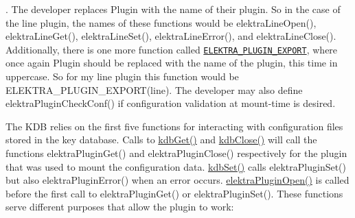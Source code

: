 . The developer replaces {\ttfamily Plugin} with the name of their plugin. So in the case of the line plugin, the names of these functions would be {\ttfamily elektra\+Line\+Open()}, {\ttfamily elektra\+Line\+Get()}, {\ttfamily elektra\+Line\+Set()}, {\ttfamily elektra\+Line\+Error()}, and {\ttfamily elektra\+Line\+Close()}. Additionally, there is one more function called \href{https://doc.libelektra.org/api/current/html/group__plugin.html#ga8dd092048e972a3f0c9c9f54eb41576e}{\tt E\+L\+E\+K\+T\+R\+A\+\_\+\+P\+L\+U\+G\+I\+N\+\_\+\+E\+X\+P\+O\+RT}, where once again {\ttfamily Plugin} should be replaced with the name of the plugin, this time in uppercase. So for my line plugin this function would be {\ttfamily E\+L\+E\+K\+T\+R\+A\+\_\+\+P\+L\+U\+G\+I\+N\+\_\+\+E\+X\+P\+O\+R\+T(line)}. The developer may also define {\ttfamily elektra\+Plugin\+Check\+Conf()} if configuration validation at mount-\/time is desired.

The K\+DB relies on the first five functions for interacting with configuration files stored in the key database. Calls to {\ttfamily \hyperlink{group__kdb_ga28e385fd9cb7ccfe0b2f1ed2f62453a1}{kdb\+Get()}} and {\ttfamily \hyperlink{group__kdb_gadb54dc9fda17ee07deb9444df745c96f}{kdb\+Close()}} will call the functions {\ttfamily elektra\+Plugin\+Get()} and {\ttfamily elektra\+Plugin\+Close()} respectively for the plugin that was used to mount the configuration data. {\ttfamily \hyperlink{group__kdb_ga11436b058408f83d303ca5e996832bcf}{kdb\+Set()}} calls {\ttfamily elektra\+Plugin\+Set()} but also {\ttfamily elektra\+Plugin\+Error()} when an error occurs. {\ttfamily \hyperlink{elektra_2plugin_8c_a32a70a7876542c51d153164ac5108a57}{elektra\+Plugin\+Open()}} is called before the first call to {\ttfamily elektra\+Plugin\+Get()} or {\ttfamily elektra\+Plugin\+Set()}. These functions serve different purposes that allow the plugin to work\+:


